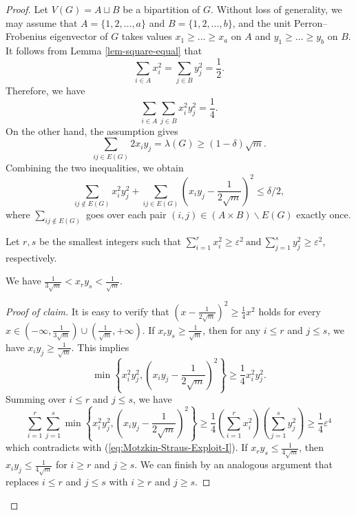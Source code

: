 \documentclass[10pt,a4paper]{amsart}
\newenvironment{poc}{\begin{proof}[Proof of claim]\renewcommand*{\qedsymbol}{$\blacksquare$}}{\end{proof}}
\begin{document}
\begin{proof}
 Let $V(G)=A\sqcup B$ be a bipartition of $G$. Without loss of generality, we may assume that $A = \{1,2,\ldots ,a\}$ and $B = \{1,2,\ldots ,b\}$, and the unit Perron--Frobenius eigenvector of $G$ takes values $x_1 \geq \dots \geq x_a$ on $A$ and $y_1 \geq \dots \geq y_b$ on $B$.   
 It follows from Lemma \ref{lem-square-equal} that
    $$\sum_{i \in A} x_i^2 = \sum_{j \in B} y_j^2 = \frac{1}{2}.$$
    Therefore, we have
    $$\sum_{i \in A} \sum_{j \in B} x_i^2y_j^2 = \frac{1}{4}.$$
    On the other hand, the assumption gives 
    $$\sum_{ij \in E(G)} 2x_i y_j = \lambda(G) \geq (1 - \delta) \sqrt{m}.$$
    Combining the two inequalities, we obtain
    \begin{equation}
    \label{eq:Motzkin-Straus-Exploit-I}
    \sum_{ij \notin E(G)} x_i^2 y_j^2 + \sum_{ij \in E(G)} \left(x_i y_j - \frac{1}{2\sqrt{m}}\right)^2 \leq \delta/2,
    \end{equation}
    where $\sum_{ij \notin E(G)}$ goes over each pair $(i, j) \in (A \times B )\backslash E(G)$ exactly once. 

    \medskip 
    Let $r, s$ be the smallest integers such that
   $\sum_{i = 1}^r x_i^2 \geq \varepsilon^2 
    ~\text{and}~  
    \sum_{j = 1}^s y_j^2 \geq \varepsilon^2$, respectively.   

\begin{claim}\label{cl:1}
We have $\frac{1}{3\sqrt{m}} < x_r y_s < \frac{1}{\sqrt{m}}$.
\end{claim}


    \begin{poc}
    It is easy to verify that $(x-\frac{1}{2\sqrt{m}})^2 \ge \frac{1}{4}x^2$ holds for every $x\in (-\infty, \frac{1}{3\sqrt{m}})\cup  (\frac{1}{\sqrt{m}}, +\infty)$. 
    If $x_r y_s \ge \frac{1}{\sqrt{m}}$, then 
    for any $i \le r$ and $j \le s$, we have $x_i y_j \geq \frac{1}{\sqrt{m}}$. This implies
    $$\min\left\{ x_i^2 y_j^2, \left(x_i y_j- \frac{1}{2\sqrt{m}} \right)^2 \right\} \geq \frac{1}{4} x_i^2 y_j^2.$$
    Summing over $i\le r$ and $j\le s$, we have
    $$\sum_{i=1}^r \sum_{j=1}^s \min\left\{ x_i^2 y_j^2, \left(x_i y_j - \frac{1}{2\sqrt{m}}\right)^2 \right\} \geq \frac{1}{4} \left(\sum_{i =1}^r x_i^2 \right) \left( \sum_{j=1}^s y_j^2 \right) \geq \frac{1}{4} \varepsilon^4$$
    which contradicts with  (\ref{eq:Motzkin-Straus-Exploit-I}). If $x_r y_s \leq \frac{1}{4\sqrt{m}}$, then $x_iy_j \le \frac{1}{4\sqrt{m}}$ 
    for $i \ge r$ and $j \ge s$. 
    We can finish by an analogous argument that replaces $i \le r$ and $j \le s$ with $i \geq r$ and $j \geq s$.
    \end{poc}


\end{proof}
\end{document}
